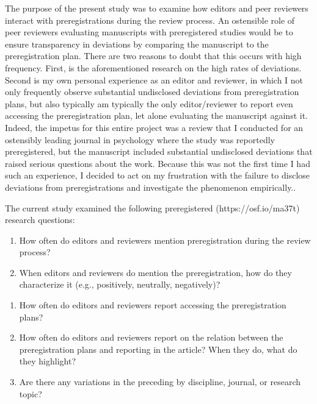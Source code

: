 \documentclass[authordate, empirical]{jote-new-article}
\begin{document}
	The purpose of the present study was to examine how editors and peer reviewers interact with preregistrations during the review process. An ostensible role of peer reviewers evaluating manuscripts with preregistered studies would be to ensure transparency in deviations by comparing the manuscript to the preregistration plan. There are two reasons to doubt that this occurs with high frequency. First, is the aforementioned research on the high rates of deviations. Second is my own personal experience as an editor and reviewer, in which I not only frequently observe substantial undisclosed deviations from preregistration plans, but also typically am typically the only editor/reviewer to report even accessing the preregistration plan, let alone evaluating the manuscript against it. Indeed, the impetus for this entire project was a review that I conducted for an ostensibly leading journal in psychology where the study was reportedly preregistered, but the manuscript included substantial undisclosed deviations that raised serious questions about the work. Because this was not the first time I had such an experience, I decided to act on my frustration with the failure to disclose deviations from preregistrations and investigate the phenomenon empirically..



	The current study examined the following preregistered (https://osf.io/ma37t) research questions:

	\begin{enumerate}


		\item How often do editors and reviewers mention preregistration during the review process?



		\item
		When editors and reviewers do mention the preregistration, how do they characterize it (e.g., positively, neutrally, negatively)?


	\end{enumerate}
	\begin{enumerate}


		\item How often do editors and reviewers report accessing the preregistration plans?



		\item
		How often do editors and reviewers report on the relation between the preregistration plans and reporting in the article? When they do, what do they highlight?



		\item Are there any variations in the preceding by discipline, journal, or research topic?


	\end{enumerate}
\end{document}
